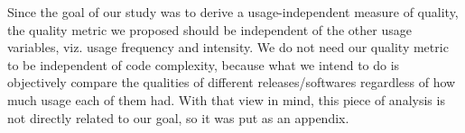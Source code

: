 \documentclass[smallcondensed]{svjour3}     %
\begin{document}
Since the goal of our study was to derive a usage-independent measure of quality, the quality metric we proposed should be independent of the other usage variables, viz. usage frequency and intensity. We do not need our quality metric to be independent of code complexity, because what we intend to do is objectively compare the qualities of different releases/softwares regardless of how much usage each of them had. With that view in mind, this piece of analysis is not directly related to our goal, so it was put as an appendix.
\end{document}
